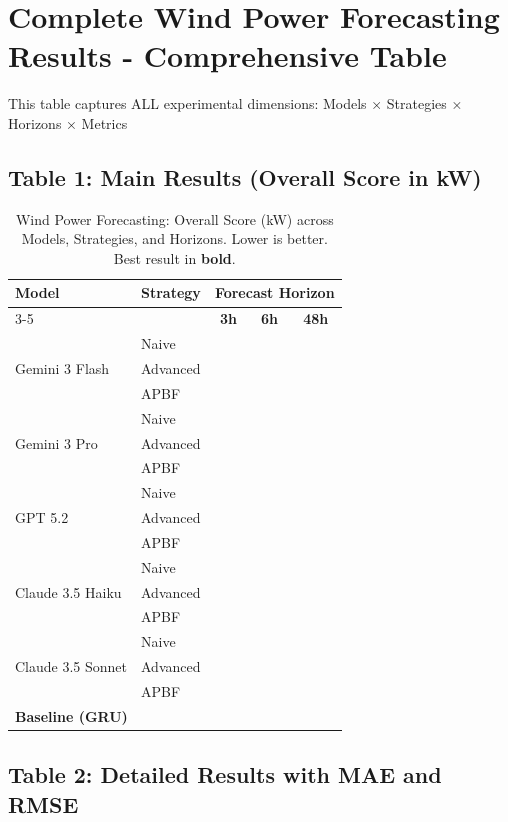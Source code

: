 \documentclass{article}
\begin{document}
\section*{Complete Wind Power Forecasting Results - Comprehensive Table}

This table captures ALL experimental dimensions: Models × Strategies × Horizons × Metrics

\subsection*{Table 1: Main Results (Overall Score in kW)}

\begin{table}[h!]
\centering
\caption{Wind Power Forecasting: Overall Score (kW) across Models, Strategies, and Horizons. Lower is better. Best result in \textbf{bold}.}
\label{tab:overall_scores}
\begin{tabular}{ll|ccc}
\toprule
\multirow{2}{*}{\textbf{Model}} & \multirow{2}{*}{\textbf{Strategy}} & \multicolumn{3}{c}{\textbf{Forecast Horizon}} \\
\cmidrule{3-5}
& & \textbf{3h} & \textbf{6h} & \textbf{48h} \\
\midrule
\multirow{3}{*}{Gemini 3 Flash}
& Naive & & & \\
& Advanced & & & \\
& APBF & & & \\
\midrule
\multirow{3}{*}{Gemini 3 Pro}
& Naive & & & \\
& Advanced & & & \\
& APBF & & & \\
\midrule
\multirow{3}{*}{GPT 5.2}
& Naive & & & \\
& Advanced & & & \\
& APBF & & & \\
\midrule
\multirow{3}{*}{Claude 3.5 Haiku}
& Naive & & & \\
& Advanced & & & \\
& APBF & & & \\
\midrule
\multirow{3}{*}{Claude 3.5 Sonnet}
& Naive & & & \\
& Advanced & & & \\
& APBF & & & \\
\midrule
\multicolumn{2}{l|}{\textbf{Baseline (GRU)}} & & & \\
\bottomrule
\end{tabular}
\end{table}

\subsection*{Table 2: Detailed Results with MAE and RMSE}
\end{document}
